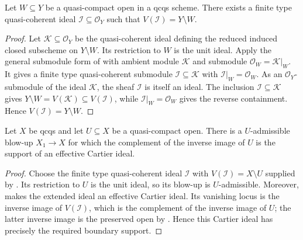 \begin{lemma}
  \label{lemma:nagata-qc-open-complement-ideal-exists}

  Let $W\subseteq Y$ be a quasi-compact open in a qcqs scheme.  There exists
  a finite type quasi-coherent ideal $\mathcal I\subseteq\mathcal O_Y$ such
  that $V(\mathcal I)=Y\setminus W$.
\end{lemma}

\begin{proof}
  Let $\mathcal K\subseteq\mathcal O_Y$ be the quasi-coherent ideal defining
  the reduced induced closed subscheme on $Y\setminus W$.  Its restriction to
  $W$ is the unit ideal.  Apply the general submodule form of
   with ambient module
  $\mathcal K$ and submodule $\mathcal O_W=\mathcal K|_W$.  It gives a finite
  type quasi-coherent submodule $\mathcal I\subseteq\mathcal K$ with
  $\mathcal I|_W=\mathcal O_W$.  As an $\mathcal O_Y$-submodule of the ideal
  $\mathcal K$, the sheaf $\mathcal I$ is itself an ideal.
  The inclusion $\mathcal I\subseteq\mathcal K$ gives
  $Y\setminus W=V(\mathcal K)\subseteq V(\mathcal I)$, while
  $\mathcal I|_W=\mathcal O_W$ gives the reverse containment.  Hence
  $V(\mathcal I)=Y\setminus W$.
\end{proof}

\begin{lemma}
  \label{lemma:nagata-cartier-boundary-preparation}

  Let $X$ be qcqs and let $U\subseteq X$ be a quasi-compact open.  There is a
  $U$-admissible blow-up $X_1\to X$ for which the complement of the inverse
  image of $U$ is the support of an effective Cartier ideal.
\end{lemma}

\begin{proof}
  Choose the finite type quasi-coherent ideal $\mathcal I$ with
  $V(\mathcal I)=X\setminus U$ supplied by
  .  Its restriction to
  $U$ is the unit ideal, so its blow-up is $U$-admissible.  Moreover,
   makes the extended ideal an
  effective Cartier ideal.  Its vanishing locus is the inverse image of
  $V(\mathcal I)$, which is the complement of the inverse image of $U$;
  the latter inverse image is the preserved open by
  .  Hence this Cartier ideal has
  precisely the required boundary support.
\end{proof}

